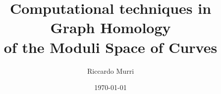 

\title{%
  Computational techniques in Graph Homology \\
  of the Moduli Space of Curves
}
\date{\today}
\author{Riccardo Murri}
\address{%
  CSCS - Centro Svizzero di Calcolo Scientifico \\
  via Cantonale, 1 \\
  CH-6928 Manno \\
  Switzerland
}

\maketitle

\setcounter{tocdepth}{2} %

\tableofcontents

